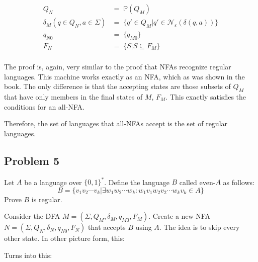 \documentclass[english]{article}
\begin{document}
\begin{align*}
                              Q_N &=\; \mathbb{P}(Q_M) \\
 \delta_M(q \in Q_N,a \in \Sigma) &=\; \{ q' \in Q_M | q' \in \mathcal{N}_\varepsilon(\delta(q,a)) \} \\
                           q_{N0} &=\; \{q_{M0}\} \\
                              F_N &=\; \{ S | S \subseteq F_M \} \\
\end{align*}

The proof is, again, very similar to the proof that NFAs recognize regular languages. This machine works exactly as an NFA, which as was shown in the book. The only difference is that the accepting states are those subsets of $Q_M$ that have only members in the final states of $M$, $F_M$. This exactly satisfies the conditions for an all-NFA.

Therefore, the set of languages that all-NFAs accept is the set of regular languages.

\subsection*{Problem 5}
Let $A$ be a language over $\{0,1\}^*$. Define the language $B$ called even-$A$ as follows:
\[ B = \{ v_1 v_2 \cdots v_k | \exists w_1 w_2 \cdots w_k : w_1 v_1 w_2 v_2 \cdots w_k v_k \in A \} \]
Prove $B$ is regular.

Consider the DFA $M = (\Sigma,Q_M,\delta_M,q_{M0},F_M)$. Create a new NFA $N = (\Sigma,Q_N,\delta_N,q_{N0},F_N)$ that accepts $B$ using $A$. The idea is to skip every other state. In other picture form, this:


Turns into this:

\end{document}
